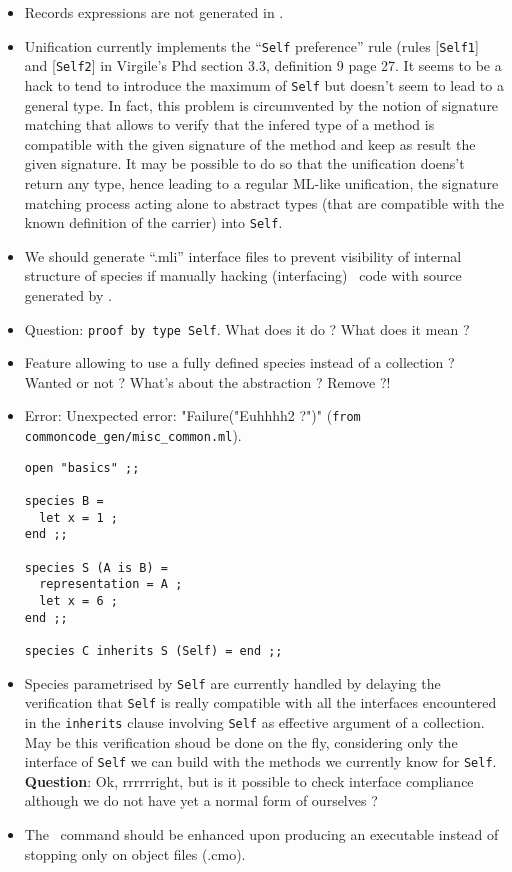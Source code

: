 \begin{itemize}
\item Records expressions are not generated in \coq.

\item Unification currently implements the ``{\tt Self} preference''
  rule (rules [{\tt Self1}] and [{\tt Self2}] in Virgile's Phd section
  3.3, definition 9 page 27. It seems to be a hack to tend to
  introduce the maximum of {\tt Self} but doesn't seem to lead to a
  general type. In fact, this problem is circumvented by the notion of
  signature matching that allows to verify that the infered type of a
  method is compatible with the given signature of the method and keep
  as result the given signature. It may be possible to do so that the
  unification doens't return any type, hence leading to a regular
  ML-like unification, the signature matching process acting alone to
  abstract types (that are compatible with the known definition of the
  carrier) into {\tt Self}.

\item We should generate ``.mli'' interface files to prevent
  visibility of internal structure of species if manually hacking
  (interfacing) \ocaml\ code with source generated by \focalizec.

\item Question: {\tt proof by type Self}. What does it do ? What does
  it mean ?

\item Feature allowing to use a fully defined species instead of a
collection ? Wanted or not ? What's about the abstraction ? Remove ?!

\item Error: Unexpected error: "Failure("Euhhhh2 ?")"
  ({\tt from commoncode\_gen/misc\_common.ml}).
\noindent
{\footnotesize
\begin{lstlisting}
open "basics" ;;

species B =
  let x = 1 ;
end ;;

species S (A is B) =
  representation = A ;
  let x = 6 ;
end ;;

species C inherits S (Self) = end ;;
\end{lstlisting}
}
\item Species parametrised by {\tt Self} are currently handled by
  delaying the verification that {\tt Self} is really compatible with
  all the interfaces encountered in the {\tt inherits} clause
  involving {\tt Self} as effective argument of a collection. May be
  this verification shoud be done on the fly, considering only the
  interface of {\tt Self} we can build with the methods we currently
  know for {\tt Self}. {\bf Question}: Ok, rrrrrright, but is it
  possible to check interface compliance although we do not have yet a
  normal form of ourselves ?

\item The \focalizec\ command should be enhanced upon producing an
  executable instead of stopping only on object files (.cmo).

\end{itemize}
